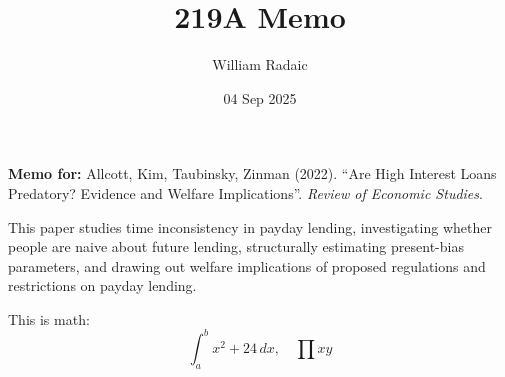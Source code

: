 \documentclass[english,11pt]{wr-note}
\title{219A Memo}
\author{William Radaic}
\date{04 Sep 2025}
\begin{document}
\maketitle


\textbf{Memo for:} Allcott, Kim, Taubinsky, Zinman (2022). “Are High Interest Loans Predatory? Evidence and Welfare Implications”. \textit{Review of Economic Studies}.

\medskip 


This paper studies time inconsistency in payday lending, investigating whether people are naive about future lending, structurally estimating present-bias parameters, and drawing out welfare implications of proposed regulations and restrictions on payday lending.

This is math: 
\begin{equation}
    \int_{a}^{b} x^2 + 24  \,dx, \quad \prod xy 
\end{equation}



\clearpage 
\printbibliography[title={References}]
\end{document}
